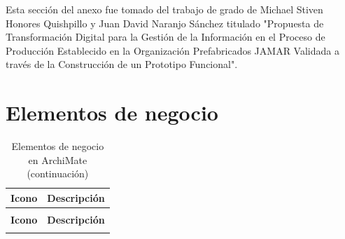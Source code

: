 \noindent
Esta sección del anexo fue tomado del trabajo de grado de Michael Stiven Honores Quishpillo y Juan David Naranjo Sánchez titulado "Propuesta de Transformación Digital para la Gestión de la Información en el Proceso de Producción Establecido en la Organización Prefabricados JAMAR Validada a través de la Construcción de un Prototipo Funcional".

\section{Elementos de negocio}

\begin{longtable}{|c|p{8cm}|}
	\caption{Elementos de negocio en ArchiMate} \label{tab:elementos-negocio-archimate}                                                  \\
	\hline
	\textbf{Icono}                                             & \textbf{Descripción}                                                    \\
	\hline
	\endfirsthead

	\caption[]{Elementos de negocio en ArchiMate (continuación)}                                                                         \\
	\hline
	\textbf{Icono}                                             & \textbf{Descripción}                                                    \\
	\hline
	\endhead

	\hline
	\endfoot


\end{longtable}
